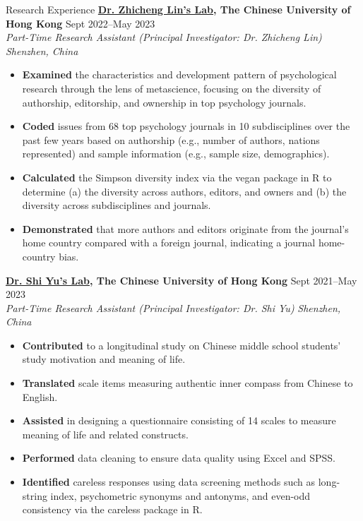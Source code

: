 \documentclass{resume} %
\begin{document}
\begin{rSection}{Research Experience}
\textbf{\href{https://myweb.cuhk.edu.cn/zclin/Home/Index}{Dr. Zhicheng Lin’s Lab}, The Chinese University of Hong Kong} \hfill{Sept 2022--May 2023} \\
\textit{Part-Time Research Assistant (Principal Investigator: Dr. Zhicheng Lin)} \hfill{\textit{Shenzhen, China}}
 \begin{itemize}
    \itemsep -5pt {} 
    \item \textbf{Examined} the characteristics and development pattern of psychological research through the lens of metascience, focusing on the diversity of authorship, editorship, and ownership in top psychology journals.
    \item \textbf{Coded} issues from 68 top psychology journals in 10 subdisciplines over the past few years based on authorship (e.g., number of authors, nations represented) and sample information (e.g., sample size, demographics).
    \item \textbf{Calculated} the Simpson diversity index via the vegan package in R to determine (a) the diversity across authors, editors, and owners and (b) the diversity across subdisciplines and journals. 
    \item \textbf{Demonstrated} that more authors and editors originate from the journal’s home country compared with a foreign journal, indicating a journal home-country bias.
 \end{itemize}

\textbf{\href{https://hss.cuhk.edu.cn/en/teacher/470}{Dr. Shi Yu’s Lab}, The Chinese University of Hong Kong} \hfill{Sept 2021--May 2023} \\
\textit{Part-Time Research Assistant (Principal Investigator: Dr. Shi Yu)} \hfill{\textit{Shenzhen, China}}
 \begin{itemize}
    \itemsep -5pt {} 
    \item \textbf{Contributed} to a longitudinal study on Chinese middle school students’ study motivation and meaning of life.
    \item \textbf{Translated} scale items measuring authentic inner compass from Chinese to English.
    \item \textbf{Assisted} in designing a questionnaire consisting of 14 scales to measure meaning of life and related constructs. 
    \item \textbf{Performed} data cleaning to ensure data quality using Excel and SPSS.
    \item \textbf{Identified} careless responses using data screening methods such as long-string index, psychometric synonyms and antonyms, and even-odd consistency via the careless package in R.
 \end{itemize}
\end{rSection} 
\end{document}
